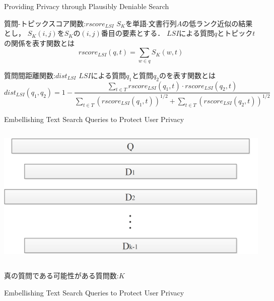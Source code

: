 \documentclass[14pt,xcolor=dvipsnames,table,dvipdfmx]{beamer}
\begin{document}
\begin{frame}{Providing Privacy through Plausibly Deniable Search \cite{providing2009}}
	\fontsize{12pt}{7.2}\selectfont
	\begin{block}{質問-トピックスコア関数:$rscore_{LSI}$}
		$S_K$を単語$\cdot$文書行列$A$の低ランク近似の結果とし，
		$S_K(i,j)$を$S_K$の$(i,j)$番目の要素とする．
		$LSI$による質問$q$とトピック$t$の関係を表す関数とは
		\begin{equation}
			rscore_{LSI}(q,t) = \sum_{w \in q}S_K(w,t)
		\end{equation}
	\end{block}
	\begin{block}{質問間距離関数:$dist_{LSI}$}
		$LSI$による質問$q_1$と質問$q_2$のを表す関数とは
		\begin{equation}
			dist_{LSI}(q_1,q_2) = 1-\frac{\sum_{t \in T}rscore_{LSI}(q_1,t) \cdot rscore_{LSI}(q_2,t)}{\sum_{t \in T}(rscore_{LSI}(q_1,t))^{1/2}+\sum_{t \in T}(rscore_{LSI}(q_2,t))^{1/2}}
		\end{equation}
	\end{block}
\end{frame}

\begin{frame}{Embellishing Text Search Queries to Protect User Privacy \cite{embellishing2010}}
	\begin{columns}[t]
		\begin{column}{0.8\textwidth} %
			\includegraphics[width=\columnwidth]{rk6.png}
		\end{column}
	\end{columns}
	\begin{block}{}
		真の質問である可能性がある質問数:$K$	
	\end{block}
\end{frame}

\begin{frame}{Embellishing Text Search Queries to Protect User Privacy \cite{embellishing2010}}
	\begin{block}{}
	\end{block}
\end{frame}
\end{document}
